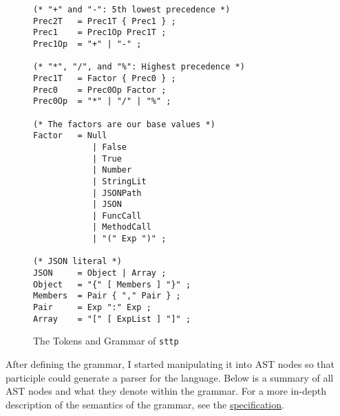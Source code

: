 \begin{figure}[H]\ContinuedFloat
    \begin{verbatim}
(* "+" and "-": 5th lowest precedence *)
Prec2T   = Prec1T { Prec1 } ;
Prec1    = Prec1Op Prec1T ;
Prec1Op  = "+" | "-" ;

(* "*", "/", and "%": Highest precedence *)
Prec1T   = Factor { Prec0 } ;
Prec0    = Prec0Op Factor ;
Prec0Op  = "*" | "/" | "%" ;

(* The factors are our base values *)
Factor   = Null
            | False
            | True
            | Number
            | StringLit
            | JSONPath
            | JSON
            | FuncCall
            | MethodCall
            | "(" Exp ")" ;

(* JSON literal *)
JSON     = Object | Array ;
Object   = "{" [ Members ] "}" ;
Members  = Pair { "," Pair } ;
Pair     = Exp ":" Exp ;
Array    = "[" [ ExpList ] "]" ;
    \end{verbatim}
    \cprotect\caption{The Tokens and Grammar of \verb|sttp|}
\end{figure}

After defining the grammar, I started manipulating it into AST nodes so that participle could generate a parser for the language. Below is a summary of all AST nodes and what they denote within the grammar. For a more in-depth description of the semantics of the grammar, see the \hyperref[appendix:sttp-specification]{specification}.

